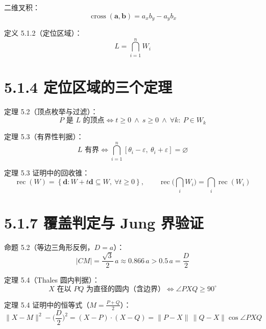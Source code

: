 \documentclass[11pt]{ctexart}
\begin{document}
二维叉积：
\begin{equation}
\operatorname{cross}(\mathbf{a},\mathbf{b}) = a_x b_y - a_y b_x
\end{equation}

定义 5.1.2（定位区域）：
\begin{equation}
L = \bigcap_{i=1}^{n} W_i
\end{equation}

\section*{5.1.4 定位区域的三个定理}

定理 5.2（顶点枚举与过滤）：
\begin{equation}
P \text{ 是 } L \text{ 的顶点}
\iff t \ge 0 \ \land\ s \ge 0 \ \land\ \forall k:\ P \in W_k
\end{equation}

定理 5.3（有界性判据）：
\begin{equation}
L \text{ 有界}
\iff \bigcap_{i=1}^{n} [\theta_i - \varepsilon,\ \theta_i + \varepsilon] = \varnothing
\end{equation}

定理 5.3 证明中的回收锥：
\begin{equation}
\operatorname{rec}(W) = \left\{ \mathbf{d} : W + t\mathbf{d} \subseteq W,\ \forall t \ge 0 \right\}, \qquad
\operatorname{rec}\!\Big(\bigcap_i W_i\Big) = \bigcap_i \operatorname{rec}(W_i)
\end{equation}

\section*{5.1.7 覆盖判定与 Jung 界验证}

命题 5.2（等边三角形反例，$D=a$）：
\begin{equation}
\lvert CM \rvert = \frac{\sqrt{3}}{2}\,a \approx 0.866\,a > 0.5\,a = \frac{D}{2}
\end{equation}

定理 5.4（Thales 圆内判据）：
\begin{equation}
X \text{ 在以 } PQ \text{ 为直径的圆内（含边界）} \iff \angle PXQ \ge 90^\circ
\end{equation}

定理 5.4 证明中的恒等式（$M = \tfrac{P+Q}{2}$）：
\begin{equation}
\|X-M\|^2 - \Big(\frac{D}{2}\Big)^2
= (X-P)\cdot(X-Q)
= \|P-X\|\,\|Q-X\|\cos\angle PXQ
\end{equation}
\end{document}
